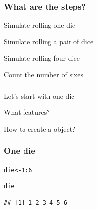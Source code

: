 \documentclass[12pt]{beamer}\usepackage[]{graphicx}\usepackage[]{color}
\makeatletter
\newcommand{\hlnum}[1]{\textcolor[rgb]{0.686,0.059,0.569}{#1}}%
\newcommand{\hlopt}[1]{\textcolor[rgb]{0,0,0}{#1}}%
\newcommand{\hlstd}[1]{\textcolor[rgb]{0.345,0.345,0.345}{#1}}%
\newcommand{\hlkwb}[1]{\textcolor[rgb]{0.69,0.353,0.396}{#1}}%
\newenvironment{kframe}{%
 \def\at@end@of@kframe{}%
 \ifinner\ifhmode%
  \def\at@end@of@kframe{\end{minipage}}%
  \begin{minipage}{\columnwidth}%
 \fi\fi%
 \def\FrameCommand##1{\hskip\@totalleftmargin \hskip-\fboxsep
 \colorbox{shadecolor}{##1}\hskip-\fboxsep
     \hskip-\linewidth \hskip-\@totalleftmargin \hskip\columnwidth}%
 \MakeFramed {\advance\hsize-\width
   \@totalleftmargin\z@ \linewidth\hsize
   \@setminipage}}%
 {\par\unskip\endMakeFramed%
 \at@end@of@kframe}
\newenvironment{knitrout}{}{} %
\makeatother
\begin{document}

\begin{frame}
\frametitle{What are the steps?}

\bbi
  \item Simulate rolling one die
  \item Simulate rolling a pair of dice
  \item Simulate rolling four dice
  \item Count the number of sixes
\ei

\end{frame}


\begin{frame}
\begin{center}
\Huge{}
\end{center}
\end{frame}


\begin{frame}[fragile]
\frametitle{}
\begin{center}
\end{center}

\bi
  \item Let's start with one die
  \item What features?
  \item How to create a {\hilit {}} object?
\ei

\end{frame}


\begin{frame}[fragile]
\frametitle{One die}

\begin{knitrout}\footnotesize
{}\color{fgcolor}\begin{kframe}
\begin{alltt}
\hlstd{die} \hlkwb{<-} \hlnum{1}\hlopt{:}\hlnum{6}

\hlstd{die}
\end{alltt}
\begin{verbatim}
## [1] 1 2 3 4 5 6
\end{verbatim}
\end{kframe}
\end{knitrout}

\end{frame}
\end{document}

